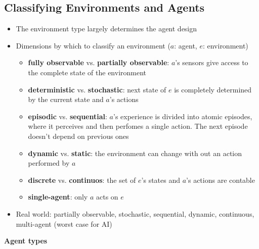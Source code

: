 \documentclass{scrartcl}
\begin{document}
\subsection{Classifying Environments and Agents}
\begin{itemize}
    \item
        The environment type largely determines the agent design
    \item
        Dimensions by which to classify an environment ($a$: agent, $e$: environment)\\
        \begin{itemize}
            \item
                \textbf{fully observable} vs. \textbf{partially observable}: $a$'s sensors give access to the complete state of the environment
            \item
                \textbf{deterministic} vs. \textbf{stochastic}: next state of $e$ is completely determined by the current state and $a$'s actions
            \item
                \textbf{episodic} vs. \textbf{sequential}: $a$'s experience is divided into atomic episodes, where it perceives and then perfomes a single action. The next episode doesn't depend on previous ones
            \item
                \textbf{dynamic} vs. \textbf{static}: the environment can change with out an action performed by $a$
            \item
                \textbf{discrete} vs. \textbf{continuos}: the set of $e$'s states and $a$'s actions are contable
            \item
                \textbf{single-agent}: only $a$ acts on $e$
        \end{itemize}
    \item
        Real world: partially observable, stochastic, sequential, dynamic, continuous, multi-agent (worst case for AI)
\end{itemize}
\textbf{Agent types}
\end{document}
